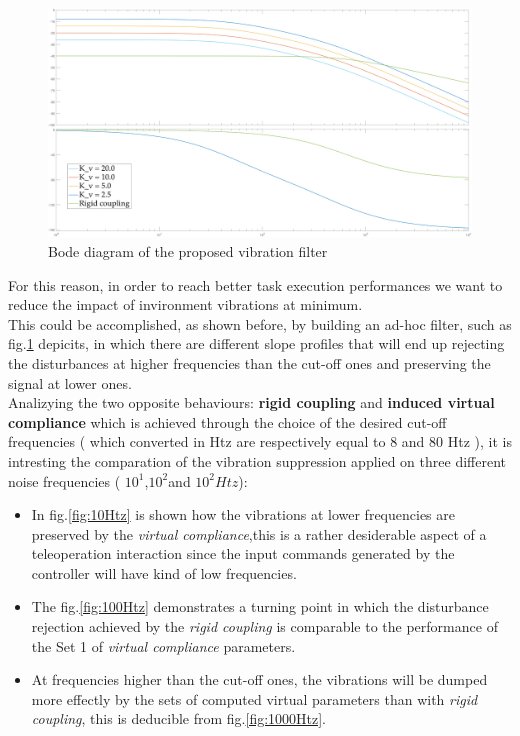 \begin{figure}
	\centering
	\includegraphics[width=0.9\linewidth]{Images/bodo}
	\caption{Bode diagram of the proposed vibration filter}
	\label{fig:bodo}
\end{figure}
For this reason, in order to reach better task execution performances we want to
reduce the impact of invironment vibrations at minimum.\\
This could be accomplished, as shown before, by building an ad-hoc filter, such
as fig.\ref{fig:bodo} depicits, in which there are different slope profiles that
will end up rejecting the disturbances at higher frequencies than the cut-off ones and preserving the
signal at lower ones.\\
Analizying the two opposite behaviours: \textbf{rigid coupling} and \textbf{induced virtual
compliance} which is achieved through the choice of the desired cut-off
frequencies ( which converted in Htz are respectively equal to 8 and 80 Htz ),
it is intresting the comparation of the vibration suppression applied on three different noise frequencies ( $10^{1}$,$10^{2}$and $10^{2} Htz$):
\begin{itemize}
\item In fig.\ref{fig:10Htz} is shown how the vibrations at lower frequencies are preserved by the
\textsl{virtual compliance},this is a rather desiderable aspect of a teleoperation interaction
since the input commands generated by the controller will have kind of low frequencies.
\item The fig.\ref{fig:100Htz} demonstrates a turning point in which the
disturbance rejection achieved by the \textsl{rigid coupling} is comparable to
the performance of the Set 1 of \textsl{virtual compliance} parameters.
\item At frequencies higher than the cut-off ones, the
vibrations will be dumped more effectly by the sets of computed virtual
parameters than with \textsl{rigid coupling}, this is deducible from fig.\ref{fig:1000Htz}.
\end{itemize}


